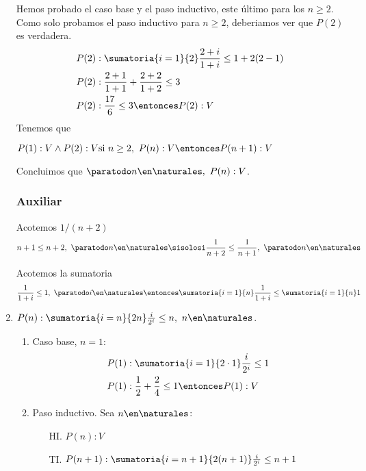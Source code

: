 \begin{enumerate}[label=\roman*)]
        Hemos probado el caso base y el paso inductivo, este último para los $n \geq 2$. Como solo probamos el paso
        inductivo para $n \geq 2$, deberiamos ver que $P(2)$ es verdadera.
        \begin{align*}
          P(2) & : \sumatoria{i=1}{2} \frac{2+i}{1+i} \leq 1 + 2(2-1) \\
          P(2) & : \frac{2+1}{1+1} + \frac{2+2}{1+2} \leq 3       \\
          P(2) & : \frac{17}{6} \leq 3 \entonces P(2): V
        \end{align*}
        Tenemos que

        $P(1): V \land P(2): V \\
          \text{si } n \geq 2, \ P(n): V \entonces P(n+1): V$

        Concluimos que $\paratodo n \en \naturales, \ P(n): V$.

        \subsubsection*{Auxiliar}
        Acotemos $1/(n+2)$
        \begin{align*}
          n+1 \leq n + 2 , \ \paratodo n \en \naturales \sisolosi \frac{1}{n+2} \leq \frac{1}{n+1},
          \ \paratodo n \en \naturales
        \end{align*}

        Acotemos la sumatoria
        \begin{align*}
          \frac{1}{1+i} \leq 1, \ \paratodo i \en \naturales \entonces \sumatoria{i=1}{n} \frac{1}{1+i} \leq \sumatoria{i=1}{n} 1
        \end{align*}

  \item $P(n):  \sumatoria{i=n}{2n} \frac{i}{2^i} \leq n, \ n \en \naturales$.
        \begin{enumerate}[label=\arabic*)]
          \item Caso base, $n = 1$:
                \begin{align*}
                  P(1) & : \sumatoria{i=1}{2 \cdot 1} \frac{i}{2^i} \leq 1       \\
                  P(1) & : \frac{1}{2} + \frac{2}{4} \leq 1 \entonces P(1): V
                \end{align*}
          \item Paso inductivo. Sea $n \en \naturales$:
                \begin{enumerate}
                  \item[HI.] $P(n): V$
                  \item[TI.] $P(n+1):  \sumatoria{i=n+1}{2(n+1)} \frac{i}{2^i} \leq n+1$
                \end{enumerate}


\end{enumerate}
\end{enumerate}

